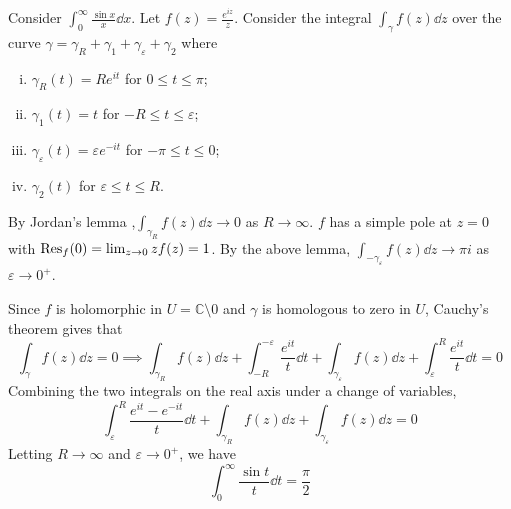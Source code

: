 \begin{example}
	Consider \( \int_0^\infty \frac{\sin x}{x} \dd{x} \).
	Let \( f(z) = \frac{e^{iz}}{z} \).
	Consider the integral \( \int_\gamma f(z) \dd{z} \) over the curve \( \gamma = \gamma_R + \gamma_1 + \gamma_\varepsilon + \gamma_2 \) where
	\begin{enumerate}[(i)]
		\item \( \gamma_R(t) = Re^{it} \) for \( 0 \leq t \leq \pi \);
		\item \( \gamma_1(t) = t \) for \( -R \leq t \leq \varepsilon \);
		\item \( \gamma_\varepsilon(t) = \varepsilon e^{-it} \) for \( -\pi \leq t \leq 0 \);
		\item \( \gamma_2(t) \) for \( \varepsilon \leq t \leq R \).
	\end{enumerate}
	By Jordan's lemma ,\( \int_{\gamma_R} f(z) \dd{z} \to 0 \) as \( R \to \infty \).
	\( f \) has a simple pole at \( z = 0 \) with \( \Res_f(0) = \lim_{z \to 0} z f(z) = 1 \).
	By the above lemma, \( \int_{-\gamma_\varepsilon} f(z) \dd{z} \to \pi i \) as \( \varepsilon \to 0^+ \).

	Since \( f \) is holomorphic in \( U = \mathbb C \setminus \qty{0} \) and \( \gamma \) is homologous to zero in \( U \), Cauchy's theorem gives that
	\[ \int_\gamma f(z) \dd{z} = 0 \implies \int_{\gamma_R} f(z) \dd{z} + \int_{-R}^{-\varepsilon} \frac{e^{it}}{t} \dd{t} + \int_{\gamma_\varepsilon} f(z) \dd{z} + \int_{\varepsilon}^R \frac{e^{it}}{t} \dd{t} = 0 \]
	Combining the two integrals on the real axis under a change of variables,
	\[ \int_{\varepsilon}^R \frac{e^{it} - e^{-it}}{t} \dd{t} + \int_{\gamma_R} f(z) \dd{z} + \int_{\gamma_{\varepsilon}} f(z) \dd{z} = 0 \]
	Letting \( R \to \infty \) and \( \varepsilon \to 0^+ \), we have
	\[ \int_0^\infty \frac{\sin t}{t} \dd{t} = \frac{\pi}{2} \]
\end{example}
